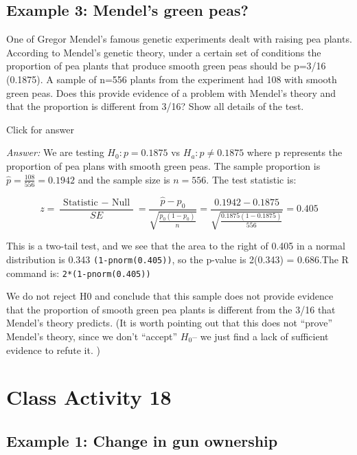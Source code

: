 \documentclass[
]{book}
\begin{document}
\hypertarget{example-3-mendels-green-peas}{%
\section{Example 3: Mendel's green peas?}\label{example-3-mendels-green-peas}}

One of Gregor Mendel's famous genetic experiments dealt with raising pea plants. According to Mendel's genetic theory, under a certain set of conditions the proportion of pea plants that produce smooth green peas should be p=3/16 (0.1875). A sample of n=556 plants from the experiment had 108 with smooth green peas. Does this provide evidence of a problem with Mendel's theory and that the proportion is different from 3/16? Show all details of the test.

Click for answer

\emph{Answer:} We are testing \(H_{0}: p=0.1875\) vs \(H_{a}: p \neq 0.1875\) where p represents the proportion of pea plans with smooth green peas. The sample proportion is \(\hat{p}=\frac{108}{556}=0.1942\) and the sample size is \(n=556\). The test statistic is:

\[z=\frac{\text { Statistic }-\text { Null }}{S E}=\frac{\hat{p}-p_{0}}{\sqrt{\frac{p_{0}\left(1-p_{0}\right)}{n}}}=\frac{0.1942-0.1875}{\sqrt{\frac{0.1875(1-0.1875)}{556}}}=0.405\]

This is a two-tail test, and we see that the area to the right of 0.405 in a normal distribution is 0.343 \texttt{(1-pnorm(0.405))}, so the p-value is 2(0.343) = 0.686.The R command is: \texttt{2*(1-pnorm(0.405))}

We do not reject H0 and conclude that this sample does not provide evidence that the proportion of smooth green pea plants is different from the 3/16 that Mendel's theory predicts. (It is worth pointing out that this does not ``prove'' Mendel's theory, since we don't ``accept'' \(H_0\)-- we just find a lack of sufficient evidence to refute it. )

\hypertarget{class-activity-18}{%
\chapter{Class Activity 18}\label{class-activity-18}}

\hypertarget{example-1-change-in-gun-ownership}{%
\section{Example 1: Change in gun ownership}\label{example-1-change-in-gun-ownership}}
\end{document}
